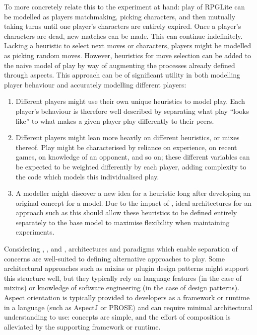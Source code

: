 To more concretely relate this to the experiment at hand: play of RPGLite can be
modelled as players matchmaking, picking characters, and then mutually taking
turns until one player's characters are entirely expired. Once a player's
characters are dead, new matches can be made. This can continue indefinitely.
Lacking a heuristic to select next moves or characters, players might be
modelled as picking random moves. However, heuristics for move selection can be
added to the naive model of play by way of augmenting the processes already
defined through aspects. This approach can be of significant utility in both
modelling player behaviour and accurately modelling different players:

\begin{enumerate}
    \item Different players might use their own unique heuristics to model play.
    Each player's behaviour is therefore well described by separating what play
    ``looks like'' to what makes a given player play differently to their peers.
    \item Different players might lean more heavily on different heuristics, or
    mixes thereof. Play might be characterised by reliance on experience, on
    recent games, on knowledge of an opponent, and so on; these different
    variables can be expected to be weighted differently by each player, adding
    complexity to the code which models this individualised play.
    \item A modeller might discover a new idea for a heuristic long after
    developing an original concept for a model. Due
    to the impact of , ideal architectures for an approach such as
    this should allow these heuristics to be defined entirely separately to
    the base model to maximise flexibility when maintaining experiments.
\end{enumerate}

Considering , , and , architectures and
paradigms which enable separation of concerns are well-suited to defining
alternative approaches to play. Some architectural approaches such as mixins or
plugin design patterns might support this structure well, but they typically
rely on language features (in the case of mixins) or knowledge of software
engineering (in the case of design patterns). Aspect orientation is typically
provided to developers as a framework or runtime in a language (such as
AspectJ\cite{aspectj_intro} or PROSE\cite{popovici2002PROSE}) and can require
minimal architectural understanding to use: concepts are simple, and the effort
of composition is alleviated by the supporting framework or runtime.

